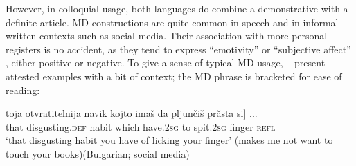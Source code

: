 \documentclass[output=paper,
colorlinks,
citecolor=brown,
newtxmath
]{langscibook}
\begin{document}
\ea \label{Mperson}


\z
\z

\noindent However, in colloquial usage, both languages do combine a demonstrative with a definite article. MD constructions are quite common in speech and in informal written contexts such as social media. Their association with more personal registers is no accident, as they tend to express ``emotivity'' or ``subjective affect'' \citep{Friedman2019}, either positive or negative. To give a sense of typical MD usage, -- present attested examples with a bit of context; the MD phrase is bracketed for ease of reading:


\ea \label{Bmedia}
\ea \label{licking}
\gll \minsp{[} toja 	otvratitelnija navik kojto imaš 	da 	pljunčiš 	prăsta 	si] ...\\
{} that 	disgusting.\textsc{def} 	habit 	which 	have.\textsc{2sg} 	to 	spit.\textsc{2sg}	finger 	\textsc{refl} \\
\glt `that disgusting habit you have of licking your finger' (makes me not want to touch your books)\hfill (Bulgarian; social media)
\end{document}
